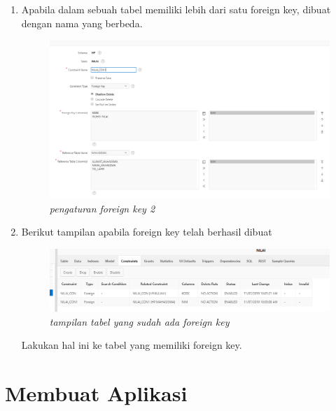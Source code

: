 \begin{enumerate}
    \item Apabila dalam sebuah tabel memiliki lebih dari satu foreign key, dibuat dengan nama yang berbeda.
    
    \newpage
    \begin{figure}[!htbp]
        \centering
        \includegraphics[scale=0.5]{figure/pengaturan_foreign_key_2.PNG}
        \caption{\textit{pengaturan foreign key 2}}
        \label{fig:my_label}
    \end{figure}
    
    \item Berikut tampilan apabila foreign key telah berhasil dibuat
    
    \begin{figure}[!htbp]
        \centering
        \includegraphics[scale=0.7]{figure/tampilan_tabel_yang_sudah_ada_foreign_key.PNG}
        \caption{\textit{tampilan tabel yang sudah ada foreign key}}
        \label{fig:my_label}
    \end{figure}
    
    Lakukan hal ini ke tabel yang memiliki foreign key.
    
\end{enumerate}

\section{Membuat Aplikasi}

